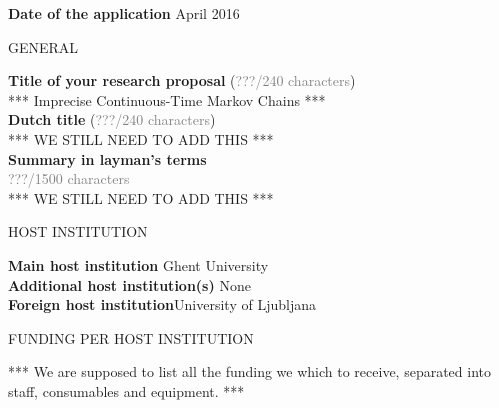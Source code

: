 \documentclass[11pt,dvipsnames,usenames,a4paper]{article}
\begin{document}
\newcommand{\todo}[1]{\textcolor{red}{\emph{#1}}}


{\bf Date of the application}  April 2016 \\


\vspace{10pt}

\begin{shaded}\centering GENERAL \end{shaded}
\textbf{Title of your research proposal} (\textcolor{Gray}{???/240 characters})\\ *** Imprecise Continuous-Time Markov Chains *** \\[8pt]
\textbf{Dutch title} (\textcolor{Gray}{???/240 characters})\\
 *** WE STILL NEED TO ADD THIS ***\\[8pt]
\textbf{Summary in layman's terms}\\
\textcolor{Gray}{???/1500 characters}\\
*** WE STILL NEED TO ADD THIS ***


\vspace{10pt}

\begin{shaded}\centering HOST INSTITUTION \end{shaded}
\textbf{Main host institution} \tab Ghent University \\
\textbf{Additional host institution(s)} \tab None\\
\textbf{Foreign host institution}\tab University of Ljubljana \\

\begin{shaded}\centering FUNDING PER HOST INSTITUTION \end{shaded}

*** We are supposed to list all the funding we which to receive, separated into staff, consumables and equipment. ***
\end{document}
